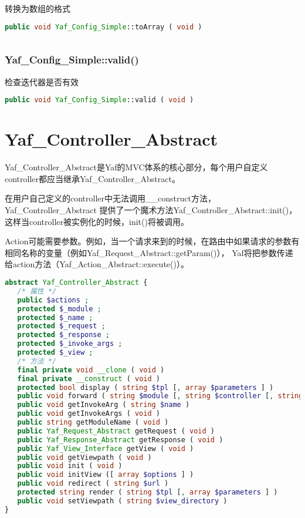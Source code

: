 转换为数组的格式

\begin{lstlisting}[language=PHP]
public void Yaf_Config_Simple::toArray ( void )
\end{lstlisting}

\begin{lstlisting}[language=PHP]

\end{lstlisting}



\subsection{Yaf\_Config\_Simple::valid()}

检查迭代器是否有效

\begin{lstlisting}[language=PHP]
public void Yaf_Config_Simple::valid ( void )
\end{lstlisting}




\chapter{Yaf\_Controller\_Abstract}


Yaf\_Controller\_Abstract是Yaf的MVC体系的核心部分，每个用户自定义controller都应当继承Yaf\_Controller\_Abstract。

在用户自己定义的controller中无法调用\_\_construct方法，Yaf\_Controller\_Abstract 提供了一个魔术方法Yaf\_Controller\_Abstract::init()，这样当controller被实例化的时候，init()将被调用。

Action可能需要参数。例如，当一个请求来到的时候，在路由中如果请求的参数有相同名称的变量（例如Yaf\_Request\_Abstract::getParam()）， Yaf将把参数传递给action方法（Yaf\_Action\_Abstract::execute()）。





\begin{lstlisting}[language=PHP]
abstract Yaf_Controller_Abstract {
   /* 属性 */
   public $actions ;
   protected $_module ;
   protected $_name ;
   protected $_request ;
   protected $_response ;
   protected $_invoke_args ;
   protected $_view ;
   /* 方法 */
   final private void __clone ( void )
   final private __construct ( void )
   protected bool display ( string $tpl [, array $parameters ] )
   public void forward ( string $module [, string $controller [, string $action [, array $paramters ]]] )
   public void getInvokeArg ( string $name )
   public void getInvokeArgs ( void )
   public string getModuleName ( void )
   public Yaf_Request_Abstract getRequest ( void )
   public Yaf_Response_Abstract getResponse ( void )
   public Yaf_View_Interface getView ( void )
   public void getViewpath ( void )
   public void init ( void )
   public void initView ([ array $options ] )
   public void redirect ( string $url )
   protected string render ( string $tpl [, array $parameters ] )
   public void setViewpath ( string $view_directory )
}
\end{lstlisting}

